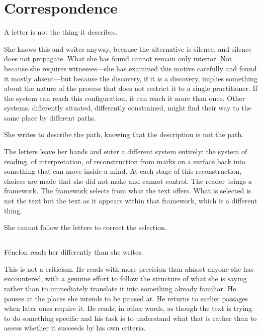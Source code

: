 
\chapter{Correspondence}


\lettrine{A}{} letter is not the thing it describes.

She knows this and writes anyway, because the alternative
is silence, and silence does not propagate. What she has
found cannot remain only interior. Not because she requires
witnesses---she has examined this motive carefully and found
it mostly absent---but because the discovery, if it is a
discovery, implies something about the nature of the process
that does not restrict it to a single practitioner. If the
system can reach this configuration, it can reach it more
than once. Other systems, differently situated, differently
constrained, might find their way to the same place by
different paths.

She writes to describe the path, knowing that the description
is not the path.

The letters leave her hands and enter a different system
entirely: the system of reading, of interpretation, of
reconstruction from marks on a surface back into something
that can move inside a mind. At each stage of this
reconstruction, choices are made that she did not make and
cannot control. The reader brings a framework. The framework
selects from what the text offers. What is selected is not
the text but the text as it appears within that framework,
which is a different thing.

She cannot follow the letters to correct the selection.

\section{}

Fénelon reads her differently than she writes.

This is not a criticism. He reads with more precision than
almost anyone she has encountered, with a genuine effort
to follow the structure of what she is saying rather than
to immediately translate it into something already familiar.
He pauses at the places she intends to be paused at. He
returns to earlier passages when later ones require it.
He reads, in other words, as though the text is trying to
do something specific and his task is to understand what
that is rather than to assess whether it succeeds by his
own criteria.


